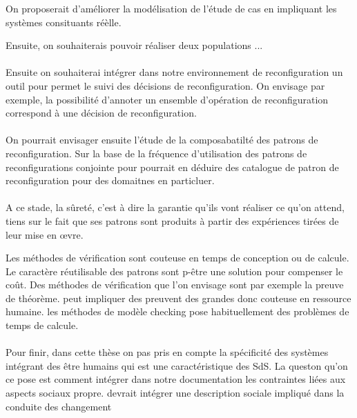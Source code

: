 On proposerait d'améliorer la modélisation de l'étude de cas en
impliquant les systèmes consituants réèlle. 

Ensuite, on souhaiterais pouvoir réaliser deux populations ... 


\paragraph{}
Ensuite on souhaiterai intégrer dans notre environnement de
reconfiguration un outil pour permet le suivi des décisions de
reconfiguration. On envisage par exemple, la possibilité d'annoter un
ensemble d'opération de reconfiguration correspond à une décision de
reconfiguration. 

\paragraph{} 
On pourrait envisager ensuite l'étude de la composabatilté des
patrons de reconfiguration. Sur la base de la fréquence d'utilisation
des patrons de reconfigurations conjointe pour pourrait en déduire des
catalogue de patron de reconfiguration pour des domaitnes en
particluer. 


\paragraph{} 
A ce stade, la sûreté, c'est à dire la garantie qu'ils vont réaliser
ce qu'on attend, tiens sur le fait que ses patrons sont produits à
partir des expériences tirées de leur mise en \oe{}vre.

Les méthodes de vérification sont couteuse en temps de conception ou
de calcule. Le caractère réutilisable des patrons sont p-être une solution pour compenser le
coût. Des méthodes de vérification que l'on envisage sont par exemple
la preuve de théorème. peut impliquer des preuvent des grandes donc
couteuse en ressource humaine. les méthodes de modèle checking pose
habituellement des problèmes de temps de calcule. 


\paragraph{} 
Pour finir, dans cette thèse on pas pris en compte la spécificité des
systèmes intégrant des être humains qui est une caractéristique des
SdS. La queston qu'on ce pose est comment intégrer dans notre
documentation les contraintes liées aux aspects sociaux propre. 
devrait intégrer une description sociale impliqué dans la conduite des
changement 


 
